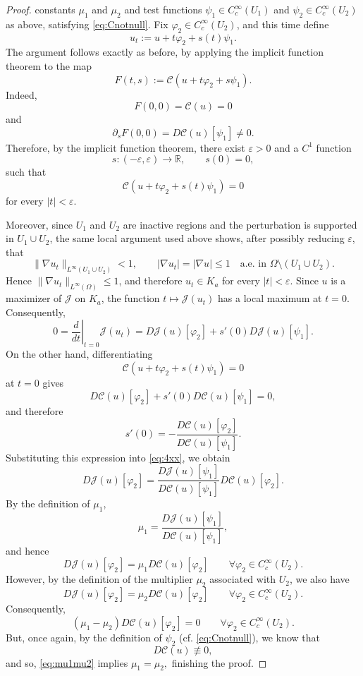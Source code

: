 \documentclass[11pt,reqno]{amsart}
\theoremstyle{plain}
\theoremstyle{definition}
\numberwithin{equation}{section}
\begin{document}
\begin{proof}
constants $\mu_1$ and $\mu_2$ and test functions
$\psi_1\in C_c^\infty(U_1)$ and $\psi_2\in C_c^\infty(U_2)$ as above,
satisfying \eqref{eq:Cnotnull}. Fix
$\varphi_2\in C_c^\infty(U_2)$, and this time define
$$
u_t:=u+t\varphi_2+s(t)\psi_1.
$$
The argument follows exactly as before, by applying the implicit function
theorem to the map
$$
F(t,s):=
\mathcal C(u+t\varphi_2+s\psi_1).
$$
Indeed,
$$
F(0,0)=\mathcal C(u)=0
$$
and
$$
\partial_sF(0,0)
=
D\mathcal C(u)[\psi_1]\neq0.
$$
Therefore, by the implicit function theorem, there exist
$\varepsilon>0$ and a $C^1$ function
$$
s:(-\varepsilon,\varepsilon)\to\mathbb R,
\qquad s(0)=0,
$$
such that
$$
\mathcal C(u+t\varphi_2+s(t)\psi_1)=0
$$
for every $|t|<\varepsilon$.

Moreover, since $U_1$ and $U_2$ are inactive regions and the perturbation is supported in $U_1\cup U_2$, the same local argument used above shows, after possibly reducing $\varepsilon$, that
$$
\|\nabla u_t\|_{L^\infty(U_1\cup U_2)}<1,
\qquad
|\nabla u_t|=|\nabla u|\leq1
\quad\text{a.e. in }\Omega\setminus(U_1\cup U_2).
$$
Hence $\|\nabla u_t\|_{L^\infty(\Omega)}\leq1$, and therefore $u_t\in K_a$ for every $|t|<\varepsilon$. Since $u$ is a maximizer of $\mathcal J$ on $K_a$, the function
$t\mapsto\mathcal J(u_t)$ has a local maximum at $t=0$. Consequently,
\begin{equation} \label{eq:4xx}
0
=
\left.\frac{d}{dt}\right|_{t=0}
\mathcal J(u_t)
=
D\mathcal J(u)[\varphi_2]
+s'(0)D\mathcal J(u)[\psi_1].
\end{equation}
On the other hand, differentiating
$$
\mathcal C(u+t\varphi_2+s(t)\psi_1)=0
$$
at $t=0$ gives
$$
D\mathcal C(u)[\varphi_2]
+s'(0)D\mathcal C(u)[\psi_1]
=0,
$$
and therefore
$$
s'(0)
=
-\frac{D\mathcal C(u)[\varphi_2]}
        {D\mathcal C(u)[\psi_1]}.
$$
Substituting this expression into \eqref{eq:4xx}, we obtain
$$
D\mathcal J(u)[\varphi_2]
=
\frac{D\mathcal J(u)[\psi_1]}
     {D\mathcal C(u)[\psi_1]}
D\mathcal C(u)[\varphi_2].
$$
By the definition of $\mu_1$,
$$
\mu_1
=
\frac{D\mathcal J(u)[\psi_1]}
     {D\mathcal C(u)[\psi_1]},
$$
and hence
$$
D\mathcal J(u)[\varphi_2]
=
\mu_1D\mathcal C(u)[\varphi_2]
\qquad
\forall\varphi_2\in C_c^\infty(U_2).
$$
However, by the definition of the multiplier $\mu_2$ associated with
$U_2$, we also have
$$
D\mathcal J(u)[\varphi_2]
=
\mu_2D\mathcal C(u)[\varphi_2]
\qquad
\forall\varphi_2\in C_c^\infty(U_2).
$$
Consequently,
\begin{equation} \label{eq:mu1mu2}
(\mu_1-\mu_2)
D\mathcal C(u)[\varphi_2]=0
\qquad
\forall\varphi_2\in C_c^\infty(U_2).
\end{equation}
But, once again,  by the definition of $\psi_2$ (cf. \eqref{eq:Cnotnull}), we know that
$$
D\mathcal C(u) \not \equiv 0,
$$
and so, \eqref{eq:mu1mu2} implies $\mu_1=\mu_2,$
finishing the proof.
\end{proof}
\end{document}
